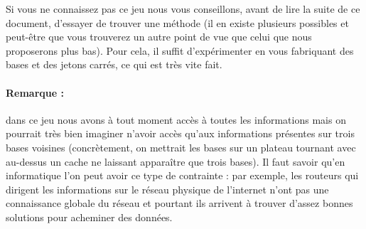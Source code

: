 Si vous ne connaissez pas ce jeu nous vous conseillons, avant de lire la suite de ce document, d'essayer de trouver une méthode (il en existe plusieurs possibles et peut-être que vous trouverez un autre point de vue que celui que nous proposerons plus bas). Pour cela, il suffit d'expérimenter en vous fabriquant des bases et des jetons carrés, ce qui est très vite fait.


\paragraph{Remarque :} \hspace{-1em} dans ce jeu nous avons à tout moment accès à toutes les informations mais on pourrait très bien imaginer n'avoir accès qu'aux informations présentes sur trois bases voisines (concrètement, on mettrait les bases sur un plateau tournant avec au-dessus un cache ne laissant apparaître que trois bases). Il faut savoir qu'en informatique l'on peut avoir ce type de contrainte : par exemple, les routeurs qui dirigent les informations sur le réseau physique de l'internet n'ont pas une connaissance globale du réseau et pourtant ils arrivent à trouver d'assez bonnes solutions pour acheminer des données.

